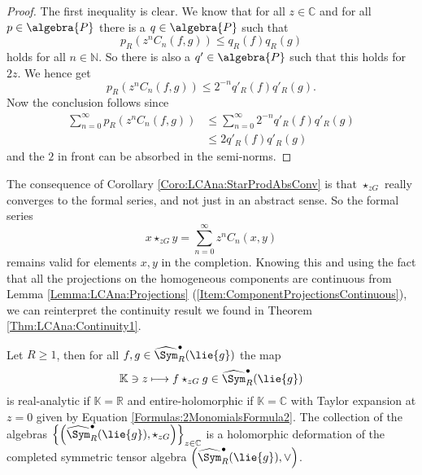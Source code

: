 \begin{proof}
	The first inequality is clear. We know that for all $z \in \mathbb{C}$ 
	and for all $p \in \algebra{P}$ there is a $q \in \algebra{P}$ such that
	\begin{equation*}
		p_R \left( z^n C_n(f, g) \right)
		\leq
		q_R(f) q_R(g)
	\end{equation*}
	holds for all $n \in \mathbb{N}$. So there is also a $q' \in 
	\algebra{P}$ such that this holds for $2z$. We hence get
	\begin{equation*}
		p_R \left( z^n C_n(f, g) \right)
		\leq
		2^{-n} q'_R(f) q'_R(g).
	\end{equation*}
	Now the conclusion follows since
	\begin{align*}
		\sum\limits_{n = 0}^{\infty}
		p_R \left( z^n C_n(f, g) \right)
		& \leq
		\sum\limits_{n = 0}^{\infty}
		2^{-n} q'_R(f) q'_R(g)
		\\
		& \leq
		2 q'_R(f) q'_R(g)
	\end{align*}
	and the $2$ in front can be absorbed in the semi-norms.
\end{proof}
The consequence of Corollary \ref{Coro:LCAna:StarProdAbsConv} is that 
$\star_{zG}$ really converges to the formal series, and not just in an 
abstract sense. So the formal series 
\begin{equation*}
	x \star_{zG} y
	=
	\sum\limits_{n = 0}^{\infty}
	z^n C_n(x,y)
\end{equation*}
remains valid for elements $x,y$ in the completion. Knowing this and using the 
fact that all the projections on the homogeneous components are continuous 
from Lemma \ref{Lemma:LCAna:Projections} 
(\ref{Item:ComponentProjectionsContinuous}), we can reinterpret the 
continuity result we found in Theorem \ref{Thm:LCAna:Continuity1}.
\begin{proposition}
    \label{Prop:LCAna:HolomorphicDependence}%
    Let $R \geq 1$, then for all $f, g \in
    \widehat{\Sym}_R^{\bullet}(\lie{g})$ the map
    \begin{equation}
        \label{LCAna:Holomorphicity}
        \mathbb{K} \ni z
        \longmapsto
        f \star_{zG} g \in
        \widehat{\Sym}_R^{\bullet}(\lie{g})
    \end{equation}
    is real-analytic if $\mathbb{K} = \mathbb{R}$ and
    entire-holomorphic if $\mathbb{K} = \mathbb{C}$ with Taylor
    expansion at $z = 0$ given by Equation 
    \eqref{Formulas:2MonomialsFormula2}. The collection of the algebras 
    $\left\{ \left( \widehat{\Sym}_R^{\bullet}(\lie{g}), \star_{zG} \right) 
    \right\}_{z \in \mathbb{C}}$ is a holomorphic deformation of 
    the completed symmetric tensor algebra 
    $\left( \widehat{\Sym}_R^{\bullet}(\lie{g}), \vee \right)$.
\end{proposition}
